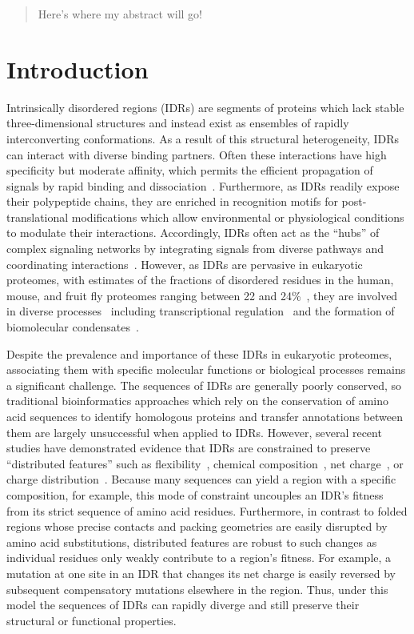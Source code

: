 \begin{abstract}
\noindent
Here's where my abstract will go!
\end{abstract}

\section{Introduction}
Intrinsically disordered regions (IDRs) are segments of proteins which lack stable three-dimensional structures and instead exist as ensembles of rapidly interconverting conformations. As a result of this structural heterogeneity, IDRs can interact with diverse binding partners. Often these interactions have high specificity but moderate affinity, which permits the efficient propagation of signals by rapid binding and dissociation~\cite{Zhou2012, Wright2014}. Furthermore, as IDRs readily expose their polypeptide chains, they are enriched in recognition motifs for post-translational modifications which allow environmental or physiological conditions to modulate their interactions. Accordingly, IDRs often act as the ``hubs'' of complex signaling networks by integrating signals from diverse pathways and coordinating interactions~\cite{Dunker2005, Buljan2012}. However, as IDRs are pervasive in eukaryotic proteomes, with estimates of the fractions of disordered residues in the human, mouse, and fruit fly proteomes ranging between 22 and 24\%~\cite{Piovesan2020, Piovesan2022}, they are involved in diverse processes~\cite{vanderLee2014} including transcriptional regulation~\cite{Liu2006} and the formation of biomolecular condensates~\cite{Banani2017}.

Despite the prevalence and importance of these IDRs in eukaryotic proteomes, associating them with specific molecular functions or biological processes remains a significant challenge. The sequences of IDRs are generally poorly conserved, so traditional bioinformatics approaches which rely on the conservation of amino acid sequences to identify homologous proteins and transfer annotations between them are largely unsuccessful when applied to IDRs. However, several recent studies have demonstrated evidence that IDRs are constrained to preserve ``distributed features'' such as flexibility~\cite{Daughdrill2007}, chemical composition~\cite{Moesa2012}, net charge~\cite{Zarin2017}, or charge distribution~\cite{Beh2012}. Because many sequences can yield a region with a specific composition, for example, this mode of constraint uncouples an IDR's fitness from its strict sequence of amino acid residues. Furthermore, in contrast to folded regions whose precise contacts and packing geometries are easily disrupted by amino acid substitutions, distributed features are robust to such changes as individual residues only weakly contribute to a region's fitness. For example, a mutation at one site in an IDR that changes its net charge is easily reversed by subsequent compensatory mutations elsewhere in the region. Thus, under this model the sequences of IDRs can rapidly diverge and still preserve their structural or functional properties.

